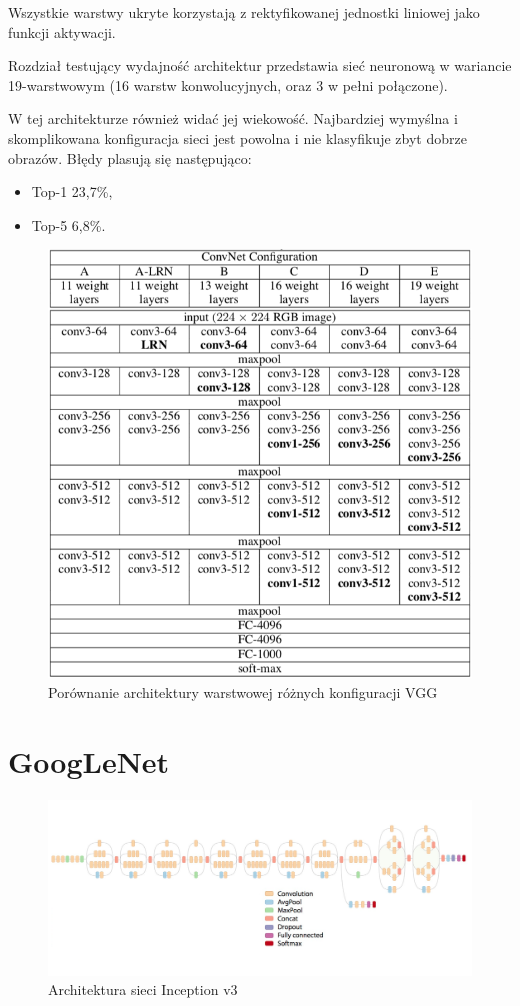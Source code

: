 \documentclass[12pt,a4paper,twoside,titlepage,openright]{book}
\begin{document}
Wszystkie warstwy ukryte korzystają z rektyfikowanej jednostki liniowej jako funkcji aktywacji.

Rozdział testujący wydajność architektur przedstawia sieć neuronową w wariancie 19-warstwowym (16 warstw konwolucyjnych, oraz 3 w pełni połączone). \cite{DBLP:journals/corr/SimonyanZ14a}

W tej architekturze również widać jej wiekowość. Najbardziej wymyślna i skomplikowana konfiguracja sieci jest powolna i nie klasyfikuje zbyt dobrze obrazów. Błędy plasują się następująco:
\begin{itemize}
\item Top-1 23,7\%,
\item Top-5 6,8\%.
\end{itemize}

\begin{figure}[ht]
	\centering
			\includegraphics[resolution=100, scale=0.8]{vggArchComparison.png}
		\caption{Porównanie architektury warstwowej różnych konfiguracji VGG}
\end{figure}


\section{GoogLeNet}
\begin{figure}[h]
	\centering
			\includegraphics[resolution=100, scale=0.36]{inceptionv3architecture.png}
		\caption{Architektura sieci Inception v3}
\end{figure}
\end{document}
